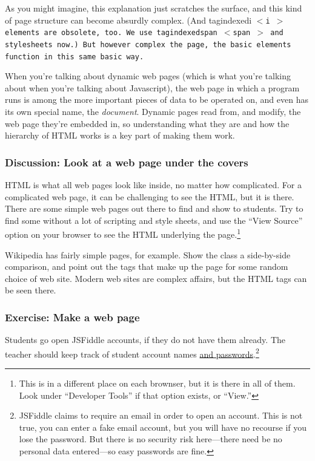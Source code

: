\documentclass[11pt]{article}
\makeatletter
\newcommand{\new}[1]{\index{#1}\emph{#1}}
\newcommand{\tag}[2][\relax]{%
  \ifcsname tagindexed#2\endcsname\relax\else%
  \index{#2@\texttt{$<$#2$>$}}%
  \expandafter\gdef\csname tagindexed#2\endcsname{\relax}\fi%
  \bgroup\tt$<$#2\ifx#1\relax\relax\else~#1\fi$>$\egroup}
\makeatother
\begin{document}
As you might imagine, this explanation just scratches the surface, and
this kind of page structure can become absurdly complex.  (And \tag{i}
elements are obsolete, too.  We use \tag{span} and stylesheets now.)
But however complex the page, the basic elements function in this same
basic way.

When you're talking about dynamic web pages (which is what you're
talking about when you're talking about Javascript), the web page in
which a program runs is among the more important pieces of data to be
operated on, and even has its own special name, the \new{document}.
Dynamic pages read from, and modify, the web page they're embedded in,
so understanding what they are and how the hierarchy of HTML works is
a key part of making them work.

\subsubsection{Discussion: Look at a web page under the covers}

HTML is what all web pages look like inside, no matter how
complicated.  For a complicated web page, it can be challenging to see
the HTML, but it is there.  There are some simple web pages out there
to find and show to students.  Try to find some without a lot of
scripting and style sheets, and use the ``View Source'' option on your
browser to see the HTML underlying the page.\footnote{This is in a
  different place on each brownser, but it is there in all of them.
  Look under ``Developer Tools'' if that option exists, or ``View.''}

Wikipedia has fairly simple pages, for example.  Show the class a
side-by-side comparison, and point out the tags that make up the page
for some random choice of web site.  Modern web sites are complex
affairs, but the HTML tags can be seen there.


\subsubsection{Exercise: Make a web page}

Students go open JSFiddle accounts, if they do not have them already.
The teacher should keep track of student account names \underline{and
  passwords}.\footnote{JSFiddle claims to require an email in order to
  open an account.  This is not true, you can enter a fake email
  account, but you will have no recourse if you lose the password.
  But there is no security risk here---there need be no personal
  data entered---so easy passwords are fine.}
\end{document}
